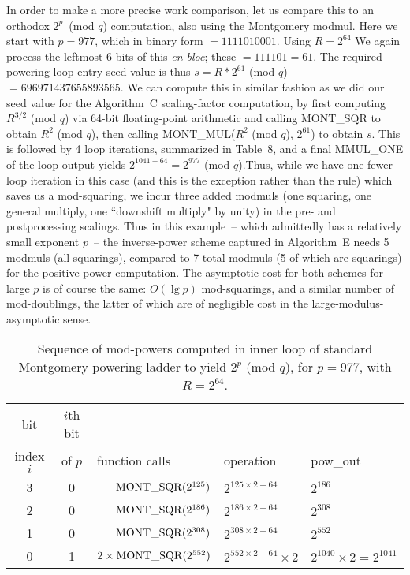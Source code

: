 \documentclass{article}
\begin{document}
In order to make a more precise work comparison, let us compare this to an orthodox $2^p$\ (mod $q$) computation, also using the Montgomery modmul. Here we start with $p = 977$, which in binary form $= 1111010001$. Using $R = 2^{64}$ We again process the leftmost 6 bits of this {\em en bloc}; these $= 111101 = 61$. The required powering-loop-entry seed value is thus $s = R*2^{61}$ (mod $q$) $= 696971437655893565$. We can compute this in similar fashion as we did our seed value for the Algorithm~C scaling-factor computation, by first computing $R^{3/2}$ (mod $q$) via 64-bit floating-point arithmetic and calling MONT\_SQR to obtain $R^2$ (mod $q$), then calling MONT\_MUL($R^2$ (mod $q$), $2^{61}$) to obtain $s$. This is followed by 4 loop iterations, summarized in Table~8, and a final MMUL\_ONE of the loop output yields $2^{1041-64} = 2^{977}$ (mod $q$).Thus, while we have one fewer loop iteration in this case (and this is the exception rather than the rule) which saves us a mod-squaring, we incur three added modmuls (one squaring, one general multiply, one ``downshift multiply" by unity) in the pre- and postprocessing scalings. Thus in this example~-- which admittedly has a relatively small exponent $p$~-- the inverse-power scheme captured in Algorithm~E needs 5 modmuls (all squarings), compared to 7 total modmuls (5 of which are squarings) for the positive-power computation. The asymptotic cost for both schemes for large $p$ is of course the same: $O(\lg p)$ mod-squarings, and a similar number of mod-doublings, the latter of which are of negligible cost in the large-modulus-asymptotic sense.
\begin{table}[ht]
\begin{center}
\label{pow_pos}
\caption{Sequence of mod-powers computed in inner loop of standard Montgomery powering ladder to yield $2^p$ (mod $q$), for $p = 977$, with $R=2^{64}$.}
\begin{tabular}{c|c|l|l|l}
	bit		&$i$th bit	&							&								&								\\
index $i$	&of $p$		&\qquad function calls		&	\qquad operation			&	\qquad pow\_out				\\
\hline
	3		&0		&$\ \ \ \ \ {\rm MONT\_SQR}(2^{125})	$&$2^{125\times2 - 64}			$&$2^{ 186}						$\\
	2		&0		&$\ \ \ \ \ {\rm MONT\_SQR}(2^{186})	$&$2^{186\times2 - 64}			$&$2^{ 308}						$\\
	1		&0		&$\ \ \ \ \ {\rm MONT\_SQR}(2^{308})	$&$2^{308\times2 - 64}			$&$2^{ 552}						$\\
	0		&1		&$2 \times	{\rm MONT\_SQR}  (2^{552})	$&$2^{552\times2 - 64}\times2	$&$2^{1040}\times2 = 2^{1041}	$
\end{tabular}
\end{center}
\end{table}
\end{document}
